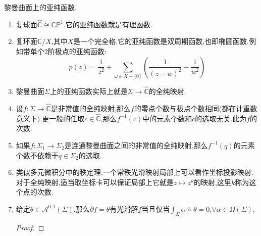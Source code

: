 黎曼曲面上的亚纯函数.
\begin{enumerate}
	\item 复球面$\widehat{\mathbb{C}}\cong\mathbb{CP}^1$.它的亚纯函数就是有理函数.
	\item 复环面$\mathbb{C}/X$,其中$X$是一个完全格.它的亚纯函数是双周期函数,也即椭圆函数.例如带单个2阶极点的亚纯函数:
	$$p(z)=\frac{1}{z^2}+\sum_{\omega\in X-\{0\}}\left(\frac{1}{(z-w)^2}-\frac{1}{w^2}\right)$$
	\item 黎曼曲面$\Sigma$上的亚纯函数实际上就是$\Sigma\to\widehat{\mathbb{C}}$的全纯映射.
	\item 设$f:\Sigma\to\widehat{\mathbb{C}}$是非常值的全纯映射,那么$f$的零点个数与极点个数相同(都在计重数意义下).更一般的任取$c\in\widehat{\mathbb{C}}$,那么$f^{-1}(c)$中的元素个数和$c$的选取无关.此为$f$的次数.
	\item 如果$f:\Sigma_1\to\Sigma_2$是连通黎曼曲面之间的非常值的全纯映射,那么$f^{-1}(q)$的元素个数不依赖于$q\in\Sigma_2$的选取.
	\item 类似多元微积分中的秩定理,一个常秩光滑映射局部上可以看作坐标投影映射.对于全纯映射,适当取坐标卡可以保证局部上它就是$z\mapsto z^k$的映射,这里$k$称为这个点的次数.
	\item 给定$\theta\in\mathscr{A}^{0,1}(\Sigma)$,那么$\overline{\partial}f=\theta$有光滑解$f$当且仅当$\int_{\Sigma}\alpha\wedge\theta=0$,$\forall\alpha\in\Omega(\Sigma)$.
	\begin{proof}
		

\end{proof}
\end{enumerate}
